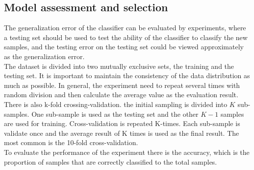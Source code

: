 \subsection{Model assessment and selection}
The generalization error of the classifier can be evaluated by experiments, where a testing set should be used to test the ability of the classifier to classify the new samples, and the testing error on the testing set could be viewed approximately as the generalization error.
\\
The dataset is divided into two mutually exclusive sets, the training and the testing set. It is important to maintain the consistency of the data distribution as much as possible. In general, the experiment need to repeat several times with random division and then calculate the average value as the evaluation result.
\\ \indent
There is also k-fold crossing-validation. the initial sampling is divided into $K$ sub-samples. One sub-sample is used as the testing set and the other $K-1$ samples are used for training. Cross-validation is repeated K-times. Each sub-sample is validate once and the average result of K times is used as the final result. The most common is the 10-fold cross-validation.
\\ \indent
To evaluate the performance of the experiment there is the accuracy, which is the proportion of samples that are correctly classified to the total samples.

